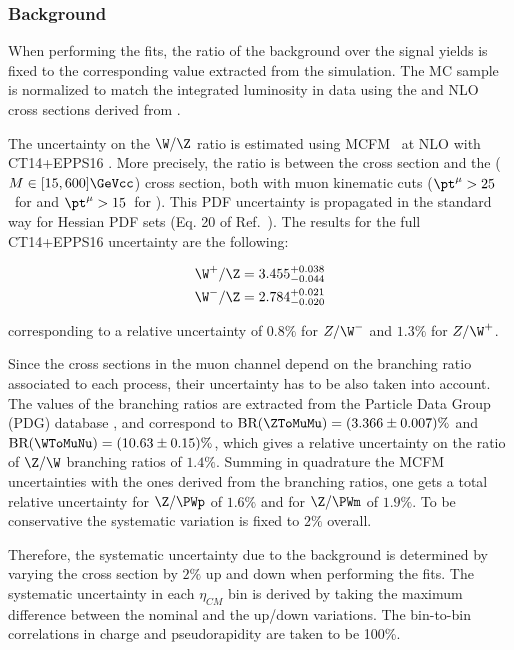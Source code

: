 \subsubsection{\texorpdfstring{\DYToMuMu}\ Background}\label{sec:WBoson_Analysis_Systematic_DYToMuMu}

When performing the fits, the ratio of the \DYToMuMu background over the signal yields is fixed to the corresponding value extracted from the simulation. The MC sample is normalized to match the integrated luminosity in data using the \DYToMuMu and \WToMuNu NLO cross sections derived from \POWHEG.

The uncertainty on the $\W/\Z$ ratio is estimated using MCFM~\cite{MCFM8} at NLO with CT14+EPPS16 \cite{CT14,EPPS16}. More precisely, the ratio is between the \WToMuNu cross section and the \DYToMuMu ($M\in [15,600]\GeVcc$) cross section, both with muon kinematic cuts ($\pt^{\mu} > 25$~\GeVc for \W and $\pt^{\mu} > 15$~\GeVc for \DY). This PDF uncertainty is propagated in the standard way for Hessian PDF sets (Eq. 20 of Ref.~\cite{PDF4LHC}). The results for the full CT14+EPPS16 uncertainty are the following:

\begin{eqnarray}
 \W^{+} / \Z = 3.455^{+0.038}_{-0.044} \\
 \W^{-} / \Z = 2.784^{+0.021}_{-0.020}
\end{eqnarray}

corresponding to a relative uncertainty of $0.8\%$ for $Z/\W^{-}$ and $1.3\%$ for $Z/\W^{+}$.

Since the cross sections in the muon channel depend on the branching ratio associated to each process, their uncertainty has to be also taken into account. The values of the branching ratios are extracted from the Particle Data Group (PDG) database \cite{PDG}, and correspond to $\textrm{BR}(\ZToMuMu) = (3.366 \pm 0.007)\%$ and $\textrm{BR}(\WToMuNu) = (10.63 \pm 0.15)\%$, which gives a relative uncertainty on the ratio of $\Z/\W$ branching ratios of $1.4\%$. Summing in quadrature the MCFM uncertainties with the ones derived from the branching ratios, one gets a total relative uncertainty for $\Z/\PWp$ of $1.6\%$ and for $\Z/\PWm$ of $1.9\%$. To be conservative the systematic variation is fixed to $2\%$ overall.

Therefore, the systematic uncertainty due to the \DYToMuMu background is determined by varying the \DYToMuMu cross section by $2\%$ up and down when performing the fits. The systematic uncertainty in each $\eta_{CM}$ bin is derived by taking the maximum difference between the nominal and the up/down variations. The bin-to-bin correlations in charge and pseudorapidity are taken to be 100\%.

